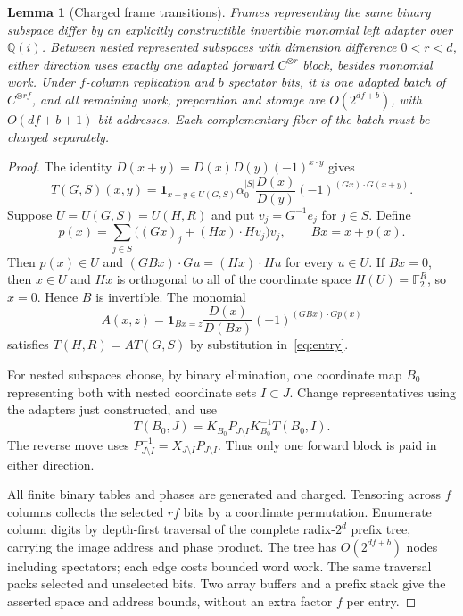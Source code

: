 \documentclass[11pt]{amsart}
\newtheorem{lemma}[theorem]{Lemma}
\theoremstyle{remark}
\newcommand{\Q}{\mathbb Q}
\newcommand{\F}{\mathbb F_2}
\begin{document}
\begin{lemma}[Charged frame transitions]\label{lem:frames}
Frames representing the same binary subspace differ by an explicitly
constructible invertible monomial left adapter over $\Q(i)$. Between
nested represented subspaces with dimension difference $0<r<d$, either
direction uses exactly one adapted forward $C^{\otimes r}$ block, besides
monomial work. Under $f$-column replication and $b$ spectator bits, it is
one adapted batch of $C^{\otimes rf}$, and all remaining work, preparation
and storage are $O(2^{df+b})$, with $O(df+b+1)$-bit addresses. Each
complementary fiber of the batch must be charged separately.
\end{lemma}
\begin{proof}
The identity $D(x+y)=D(x)D(y)(-1)^{x\cdot y}$ gives
\begin{equation}\label{eq:entry}
 T(G,S)(x,y)=\mathbf1_{x+y\in U(G,S)}\alpha_0^{|S|}
 \frac{D(x)}{D(y)}(-1)^{(Gx)\cdot G(x+y)}.
\end{equation}
Suppose $U=U(G,S)=U(H,R)$ and put $v_j=G^{-1}e_j$ for $j\in S$.
Define
\[
 p(x)=\sum_{j\in S}\bigl((Gx)_j+(Hx)\cdot Hv_j\bigr)v_j,
 \qquad Bx=x+p(x).
\]
Then $p(x)\in U$ and $(GBx)\cdot Gu=(Hx)\cdot Hu$ for every $u\in U$.
If $Bx=0$, then $x\in U$ and $Hx$ is orthogonal to all of the coordinate
space $H(U)=\F^R$, so $x=0$. Hence $B$ is invertible. The monomial
\[
 A(x,z)=\mathbf1_{Bx=z}\frac{D(x)}{D(Bx)}
             (-1)^{(GBx)\cdot Gp(x)}
\]
satisfies $T(H,R)=AT(G,S)$ by substitution in~\eqref{eq:entry}.

For nested subspaces choose, by binary elimination, one coordinate map
$B_0$ representing both with nested coordinate sets $I\subset J$.
Change representatives using the adapters just constructed, and use
\[
 T(B_0,J)=K_{B_0}P_{J\setminus I}K_{B_0}^{-1}T(B_0,I).
\]
The reverse move uses $P_{J\setminus I}^{-1}=X_{J\setminus I}P_{J\setminus I}$.
Thus only one forward block is paid in either direction.

All finite binary tables and phases are generated and charged. Tensoring
across $f$ columns collects the selected $rf$ bits by a coordinate
permutation. Enumerate column digits by depth-first traversal of the
complete radix-$2^d$ prefix tree, carrying the image address and phase
product. The tree has $O(2^{df+b})$ nodes including spectators; each edge
costs bounded word work. The same traversal packs selected and unselected
bits. Two array buffers and a prefix stack give the asserted space and
address bounds, without an extra factor $f$ per entry.
\end{proof}
\end{document}
